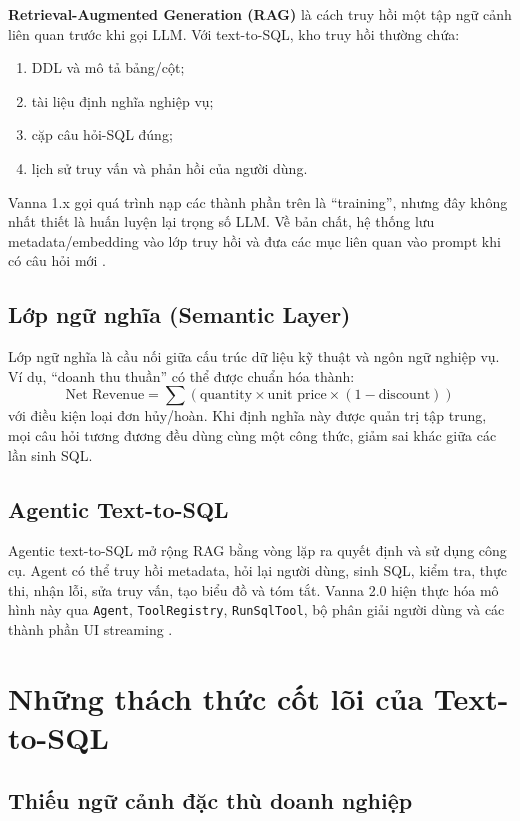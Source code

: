 \documentclass[12pt,a4paper]{article}
\begin{document}
\textbf{Retrieval-Augmented Generation (RAG)} là cách truy hồi một tập ngữ
cảnh liên quan trước khi gọi LLM. Với text-to-SQL, kho truy hồi thường chứa:

\begin{enumerate}
  \item DDL và mô tả bảng/cột;
  \item tài liệu định nghĩa nghiệp vụ;
  \item cặp câu hỏi-SQL đúng;
  \item lịch sử truy vấn và phản hồi của người dùng.
\end{enumerate}

Vanna 1.x gọi quá trình nạp các thành phần trên là ``training'', nhưng đây
không nhất thiết là huấn luyện lại trọng số LLM. Về bản chất, hệ thống lưu
metadata/embedding vào lớp truy hồi và đưa các mục liên quan vào prompt khi
có câu hỏi mới \cite{vannalegacy,vannapaper2023}.

\subsection{Lớp ngữ nghĩa (Semantic Layer)}

Lớp ngữ nghĩa là cầu nối giữa cấu trúc dữ liệu kỹ thuật và ngôn ngữ nghiệp
vụ. Ví dụ, ``doanh thu thuần'' có thể được chuẩn hóa thành:
\[
 \text{Net Revenue} =
 \sum(\text{quantity}\times\text{unit price}\times(1-\text{discount}))
\]
với điều kiện loại đơn hủy/hoàn. Khi định nghĩa này được quản trị tập trung,
mọi câu hỏi tương đương đều dùng cùng một công thức, giảm sai khác giữa các
lần sinh SQL.

\subsection{Agentic Text-to-SQL}

Agentic text-to-SQL mở rộng RAG bằng vòng lặp ra quyết định và sử dụng công
cụ. Agent có thể truy hồi metadata, hỏi lại người dùng, sinh SQL, kiểm tra,
thực thi, nhận lỗi, sửa truy vấn, tạo biểu đồ và tóm tắt. Vanna 2.0 hiện thực
hóa mô hình này qua \texttt{Agent}, \texttt{ToolRegistry},
\texttt{RunSqlTool}, bộ phân giải người dùng và các thành phần UI streaming
\cite{vanna2026}.

\section{Những thách thức cốt lõi của Text-to-SQL}

\subsection{Thiếu ngữ cảnh đặc thù doanh nghiệp}
\end{document}
